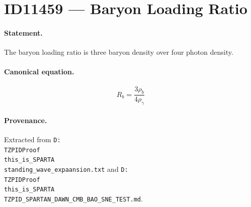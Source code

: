 \section*{ID11459 --- Baryon Loading Ratio}

\paragraph{Statement.}
The baryon loading ratio is three baryon density over four photon density.

\paragraph{Canonical equation.}
\[
R_b=\frac{3\rho_b}{4\rho_\gamma}
\]

\paragraph{Provenance.}
Extracted from \texttt{D:\\TZPIDProof\\this\_is\_SPARTA\\standing\_wave\_expaansion.txt} and \texttt{D:\\TZPIDProof\\this\_is\_SPARTA\\TZPID\_SPARTAN\_DAWN\_CMB\_BAO\_SNE\_TEST.md}.

